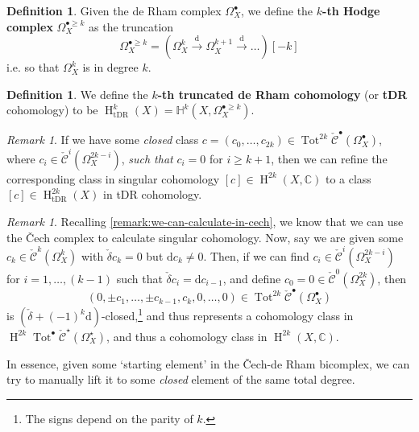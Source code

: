 \documentclass[11pt,fleqn]{article}
\theoremstyle{plain}
\theoremstyle{definition}
\newtheorem{definition}[theorem]{Definition}
\theoremstyle{remark}
\newtheorem{remark}[theorem]{Remark}
\numberwithin{equation}{theorem}
\newcommand{\anotherbullet}{\star}
\newcommand{\cech}{\check{\mathscr{C}}}
\newcommand{\define}[1]{\textbf{#1}}
\renewcommand{\d}{\mathrm{d}}
\DeclareMathOperator{\Tot}{Tot}
\DeclareMathOperator{\HH}{H}
\begin{document}
        \begin{definition}
            Given the de Rham complex $\Omega_X^\bullet$, we define the \define{$k$-th Hodge complex} $\Omega_X^{\bullet\geqslant k}$ as the truncation
            \begin{equation*}
                \Omega_X^{\bullet\geqslant k} = \left(\Omega_X^k\xrightarrow{\d}\Omega_X^{k+1}\xrightarrow{\d}\ldots\right)[-k]
            \end{equation*}
            i.e. so that $\Omega_X^k$ is in degree $k$.
        \end{definition}

        \begin{definition}
            We define the \define{$k$-th truncated de Rham cohomology} (or \define{tDR} cohomology) to be $\HH_\text{tDR}^k(X)=\mathbb{H}^k(X,\Omega_X^{\bullet\geqslant k})$.
        \end{definition}

        \begin{remark}\label{remark:when-can-we-refine-to-hodge}
            If we have some \emph{closed} class $c=(c_0,\ldots,c_{2k})\in\Tot^{2k}\cech^\bullet(\Omega^\bullet_X)$, where $c_i\in\cech^i(\Omega_X^{2k-i})$, \emph{such that} $c_i=0$ for $i\geqslant k+1$, then we can refine the corresponding class in singular cohomology $[c]\in\HH^{2k}(X,\mathbb{C})$ to a class $[c]\in\HH_\text{tDR}^{2k}(X)$ in tDR cohomology.
        \end{remark}

        \begin{remark}\label{remark:how-to-manually-lift}
            Recalling \cref{remark:we-can-calculate-in-cech}, we know that we can use the Čech complex to calculate singular cohomology.
            Now, say we are given some $c_k\in\cech^k(\Omega_X^k)$ with $\check{\delta}c_k=0$ but $\d c_k\neq0$.
            Then, if we can find $c_i\in\cech^{i}(\Omega^{2k-i}_X)$ for $i=1,\ldots,(k-1)$ such that $\check\delta c_i=\d c_{i-1}$, and define $c_0=0\in\cech^0(\Omega_X^{2k})$, then
            \begin{equation*}
                (0,\pm c_1,\ldots,\pm c_{k-1},c_k,0,\ldots,0) \in \Tot^{2k}\cech^\bullet\left(\Omega^\bullet_X\right)
            \end{equation*}
            is $(\check\delta+(-1)^k\d)$-closed,\footnote{The signs depend on the parity of $k$.} and thus represents a cohomology class in $\HH^{2k}\Tot^\bullet\cech^\anotherbullet(\Omega_X^\anotherbullet)$, and thus a cohomology class in $\HH^{2k}(X,\mathbb{C})$.

            In essence, given some `starting element' in the Čech-de Rham bicomplex, we can try to manually lift it to some \emph{closed} element of the same total degree.
        \end{remark}
\end{document}
